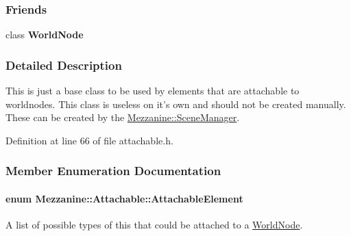 \subsubsection*{Friends}
\begin{DoxyCompactItemize}
\item 
\hypertarget{classMezzanine_1_1Attachable_a1cacd07efb11226da49a7c80569b18e8}{
class {\bfseries WorldNode}}
\label{classMezzanine_1_1Attachable_a1cacd07efb11226da49a7c80569b18e8}

\end{DoxyCompactItemize}


\subsubsection{Detailed Description}
This is just a base class to be used by elements that are attachable to worldnodes. This class is useless on it's own and should not be created manually. These can be created by the \hyperlink{classMezzanine_1_1SceneManager}{Mezzanine::SceneManager}. 

Definition at line 66 of file attachable.h.



\subsubsection{Member Enumeration Documentation}
\hypertarget{classMezzanine_1_1Attachable_a274bd45f9666f6e50f6fdd8a0162bc9e}{
\paragraph[{AttachableElement}]{\setlength{\rightskip}{0pt plus 5cm}enum {\bf Mezzanine::Attachable::AttachableElement}}\hfill}
\label{classMezzanine_1_1Attachable_a274bd45f9666f6e50f6fdd8a0162bc9e}


A list of possible types of this that could be attached to a \hyperlink{classMezzanine_1_1WorldNode}{WorldNode}. 


